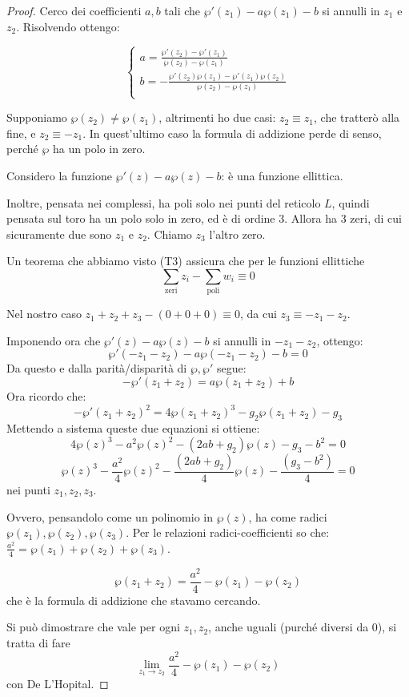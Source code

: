 \begin{proof}
Cerco dei coefficienti $a,b$ tali che $\wp'(z_1) - a\wp(z_1) - b$ si annulli in $z_1$ e $z_2$.
Risolvendo ottengo:

\begin{displaymath}
  \left\{
    \begin{array}{l}
      a = \frac{\wp'(z_2) - \wp'(z_1)}{\wp(z_2) - \wp(z_1)} \\
      b = - \frac{\wp'(z_2) \wp(z_1) - \wp'(z_1) \wp(z_2)}{\wp(z_2) - \wp(z_1)} \\
    \end{array}
  \right.
\end{displaymath}

Supponiamo $\wp(z_2) \neq \wp(z_1)$, altrimenti ho due casi: $z_2 \equiv z_1$, che tratterò alla fine, e $z_2 \equiv -z_1$.
In quest'ultimo caso la formula di addizione perde di senso, perché $\wp$ ha un polo in zero.


Considero la funzione $\wp'(z) - a \wp(z) - b$: è una funzione ellittica.

Inoltre, pensata nei complessi, ha poli solo nei punti del reticolo $L$, quindi pensata sul toro ha un polo solo in zero, ed è di ordine 3.
Allora ha 3 zeri, di cui sicuramente due sono $z_1$ e $z_2$. Chiamo $z_3$ l'altro zero.

Un teorema che abbiamo visto (T3) assicura che per le funzioni ellittiche $$ \sum_\text{zeri} z_i - \sum_\text{poli} w_i \equiv 0$$

Nel nostro caso $z_1 + z_2 + z_3 - (0+0+0) \equiv 0$, da cui $z_3 \equiv - z_1 - z_2$.

Imponendo ora che $\wp'(z) - a \wp(z) - b$ si annulli in $ -z_1 - z_2 $, ottengo:
$$ \wp'(-z_1-z_2) - a \wp(-z_1-z_2) - b = 0 $$
Da questo e dalla parità/disparità di $ \wp, \wp' $ segue:
$$ - \wp'(z_1+z_2) = a \wp(z_1+z_2) + b $$
Ora ricordo che: $$ - \wp'(z_1+z_2)^2 = 4 \wp(z_1+z_2)^3 - g_2 \wp(z_1+z_2) - g_3 $$
Mettendo a sistema queste due equazioni si ottiene:
$$4 \wp(z)^3 -a^2 \wp(z)^2 - (2ab+g_2) \wp(z) - g_3 - b^2=0$$
$$\wp(z)^3 -\frac{a^2}{4} \wp(z)^2 - \frac{(2ab+g_2)}{4} \wp(z) - \frac{(g_3 - b^2)}{4}=0$$
nei punti $z_1, z_2, z_3$.

Ovvero, pensandolo come un polinomio in $\wp(z)$, ha come radici $\wp(z_1), \wp(z_2), \wp(z_3)$.
Per le relazioni radici-coefficienti so che: $\frac{a^2}{4} = \wp(z_1) + \wp(z_2) + \wp(z_3)$.

$$\wp(z_1+z_2) = \frac{a^2}{4} - \wp(z_1) - \wp(z_2)$$
che è la formula di addizione che stavamo cercando.


Si può dimostrare che vale per ogni $z_1, z_2$, anche uguali (purché diversi da $0$), si tratta di fare
$$ \lim_{z_1 \rightarrow z_2} \frac{a^2}{4} - \wp(z_1) - \wp(z_2)$$ con De L'Hopital. 
\end{proof}


